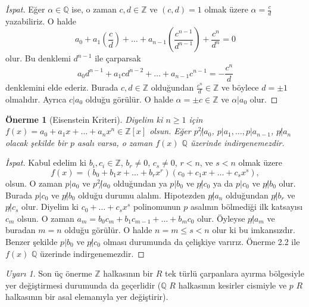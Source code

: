 \documentclass[draft]{article}
\newtheorem{prop}[thm]{Önerme}
\theoremstyle{definition}
\theoremstyle{remark}
\newtheorem{rem}{Uyarı}[section]
\begin{document}
			\begin{proof}[İspat]
			    Eğer $\alpha \in \mathbb{Q}$ ise, o zaman $c, d \in \mathbb{Z}$ ve $(c, d) = 1$ olmak üzere $\alpha = \frac{c}{d}$ yazabiliriz. O halde
				\begin{equation*}
					a_0 + a_1(\frac{c}{d}) + \dots + a_{n - 1}(\frac{c^{n - 1}}{d^{n - 1}}) + \frac{c^n}{d^n} = 0
				\end{equation*}
				olur. Bu denklemi $d^{n - 1}$ ile çarparsak
				\begin{equation*}
					a_0d^{n - 1} + a_1cd^{n - 2} + \dots + a_{n - 1}c^{n - 1} = -\frac{c^n}{d}
				\end{equation*}
				denklemini elde ederiz. Burada $c, d \in \mathbb{Z}$ olduğundan $\frac{c^n}{d} \in \mathbb{Z}$ ve böylece $d = \pm 1$ olmalıdır. Ayrıca $c | a_0$ olduğu görülür. O halde $\alpha = \pm c \in \mathbb{Z}$ ve $\alpha | a_0$ olur.
			\end{proof}
			
			\begin{prop}[Eisenstein Kriteri]
				Diyelim ki $n \geq 1$ için $f(x) = a_0 + a_1x + \dots + a_{n}x^n \in \mathbb{Z}[x]$ olsun. Eğer $p^2 \not| a_0$, $p | a_1, \dots, p | a_{n - 1}$, $p \not| a_n$ olacak şekilde bir $p$ asalı varsa, o zaman $f(x)$ $\mathbb{Q}$ üzerinde indirgenemezdir.
			\end{prop}
			
			\begin{proof}[İspat]
				Kabul edelim ki $b_i, c_i \in \mathbb{Z}$, $b_r \neq 0$, $c_s \neq 0$, $r < n$, ve $s < n$ olmak üzere
				\begin{equation*}
					f(x) = (b_0 + b_1x + \dots + b_rx^r)(c_0 + c_1x + \dots + c_sx^s),
				\end{equation*}
				olsun. O zaman $p | a_0$ ve $p^2 \not| a_0$ olduğundan ya $p | b_0$ ve $p \not| c_0$ ya da $p | c_0$ ve $p \not| b_0$ olur. Burada $p | c_0$ ve $p \not| b_0$ olduğu durumu alalım. Hipotezden $p \not| a_n$ olduğundan $p \not| b_r$ ve $p \not| c_s$ olur. Diyelim ki $c_0 + \dots + c_sx^s$ polinomunun $p$ asalının bölmediği ilk katsayısı $c_m$ olsun. O zaman $a_m = b_0c_m + b_1c_{m - 1} + \dots + b_mc_0$ olur. Öyleyse $p \not| a_m$ ve buradan $m = n$ olduğu görülür. O halde $n = m \leq s < n$ olur ki bu imkansızdır. Benzer şekilde $p | b_0$ ve $p \not| c_0$ olması durumunda da çelişkiye varırız. Önerme 2.2 ile $f(x)$ $\mathbb{Q}$ üzerinde indirgenemezdir.
			\end{proof}
			
			\begin{rem}
			    Son üç önerme $\mathbb{Z}$ halkasının bir $R$ tek türlü çarpanlara ayırma bölgesiyle yer değiştirmesi durumunda da geçerlidir ($\mathbb{Q}$ $R$ halkasının kesirler cismiyle ve $p$ $R$ halkasının bir asal elemanıyla yer değiştirir).
			\end{rem}
			
\end{document}
